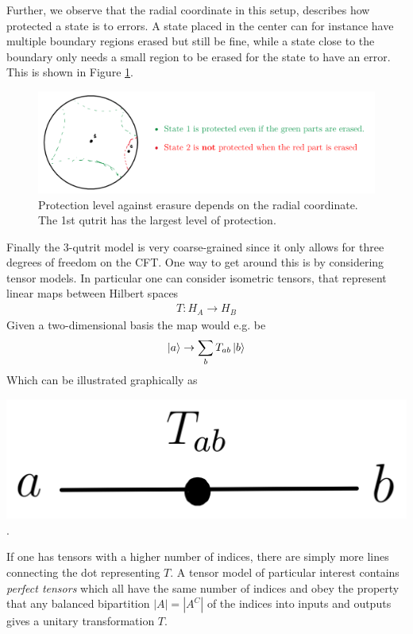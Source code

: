 \documentclass[letter,12pt]{article}
\begin{document}
Further, we observe that the radial coordinate in this setup, describes how protected a state is to errors. A state placed in the center can for instance have multiple boundary regions erased but still be fine, while a state close to the boundary only needs a small region to be erased for the state to have an error. This is shown in Figure \ref{fig:adscftfig7}.
\begin{figure}[]
	\centering
	\includegraphics[width=0.9\linewidth]{ADS_CFT_Fig7}
	\caption{Protection level against erasure depends on the radial coordinate. The 1st qutrit has the largest level of protection.}
	\label{fig:adscftfig7}
\end{figure}

Finally the 3-qutrit model is very coarse-grained since it only allows for three degrees of freedom on the CFT. One way to get around this is by considering tensor models. In particular one can consider isometric tensors, that represent linear maps between Hilbert spaces 
\begin{equation}
	\begin{aligned}
		T: H_A\to H_B
	\end{aligned}
\end{equation}
Given a two-dimensional basis the map would e.g. be
\begin{equation}
	\begin{aligned}
		\ket{a}\to \sum_b T_{ab}\ket{b}
	\end{aligned}
\end{equation} 
Which can be illustrated graphically as\\ 
\begin{center}
\includegraphics[width=0.25\linewidth]{ADS_CFT_Fig9}.
\end{center}

If one has tensors with a higher number of indices, there are simply more lines connecting the dot representing $T$. A tensor model of particular interest contains \textit{perfect tensors} which all have the same number of indices and obey the property that any balanced bipartition $|A|=|A^C|$ of the indices
into inputs and outputs gives a unitary transformation $T$.
\end{document}
